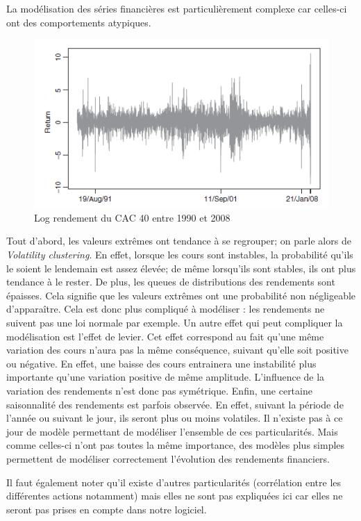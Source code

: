 		La modélisation des séries financières est particulièrement complexe car celles-ci ont des comportements atypiques.

		\begin{figure}[h]
			\center
			\includegraphics{logRendementCAC40.png}
			\caption{Log rendement du CAC 40 entre 1990 et 2008}
			\label{log_rendement}
		\end{figure}

		Tout d'abord, les valeurs extrêmes ont tendance à se regrouper; on parle alors de \textit{Volatility clustering}. En effet, lorsque les cours sont instables, la probabilité qu'ils le soient le lendemain est assez élevée; de même lorsqu'ils sont stables, ils ont plus tendance à le rester.
		De plus, les queues de distributions des rendements sont épaisses. Cela signifie que les valeurs extrêmes ont une probabilité non négligeable d'apparaître. Cela est donc plus compliqué à modéliser : les rendements ne suivent pas une loi normale par exemple.
		Un autre effet qui peut compliquer la modélisation est l'effet de levier. Cet effet correspond au fait qu'une même variation des cours n'aura pas la même conséquence, suivant qu'elle soit positive ou négative. En effet, une baisse des cours entrainera une instabilité plus importante qu'une variation positive de même amplitude. L'influence de la variation des rendements n'est donc pas symétrique.
		Enfin, une certaine saisonnalité des rendements est parfois observée. En effet, suivant la période de l'année ou suivant le jour, ils seront plus ou moins volatiles.
		Il n'existe pas à ce jour de modèle permettant de modéliser l'ensemble de ces particularités. Mais comme celles-ci n'ont pas toutes la même importance, des modèles plus simples permettent de modéliser correctement l'évolution des rendements financiers.
		
		Il faut également noter qu'il existe d'autres particularités (corrélation entre les différentes actions notamment) mais elles ne sont pas expliquées ici car elles ne seront pas prises en compte dans notre logiciel.


